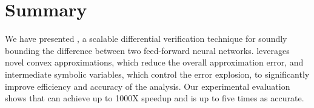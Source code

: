 %
%
%


\section{Summary}
\label{neurodiff:sec:conclusion}

We have presented \Name{}, a scalable differential verification
technique for soundly bounding the difference between two feed-forward
neural networks. \Name{} leverages novel convex approximations, which
reduce the overall approximation error, and intermediate symbolic
variables, which control the error explosion, to significantly improve
efficiency and accuracy of the analysis. Our experimental evaluation
shows that \Name{} can achieve up to 1000X speedup and is up to five
times as accurate.


